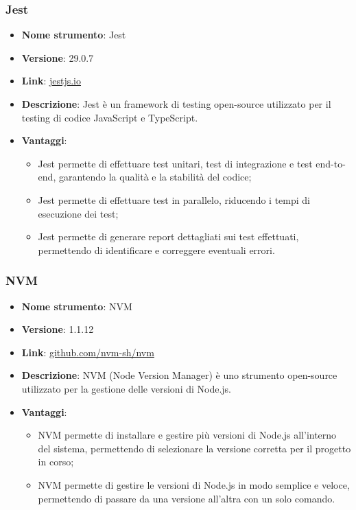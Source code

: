 \subsubsection{Jest}
\begin{itemize}
      \item \textbf{Nome strumento}: Jest
      \item \textbf{Versione}: 29.0.7
      \item \textbf{Link}: \href{https://jestjs.io/}{jestjs.io}
      \item \textbf{Descrizione}: Jest è un framework di testing open-source utilizzato per il testing di codice JavaScript e TypeScript.
      \item \textbf{Vantaggi}:
            \begin{itemize}
                  \item Jest permette di effettuare test unitari, test di integrazione e test end-to-end, garantendo la qualità e la stabilità del codice;
                  \item Jest permette di effettuare test in parallelo, riducendo i tempi di esecuzione dei test;
                  \item Jest permette di generare report dettagliati sui test effettuati, permettendo di identificare e correggere eventuali errori.
            \end{itemize}
\end{itemize}


\subsubsection{NVM}
\begin{itemize}
      \item \textbf{Nome strumento}: NVM
      \item \textbf{Versione}: 1.1.12
      \item \textbf{Link}: \href{https://github.com/nvm-sh/nvm}{github.com/nvm-sh/nvm}
      \item \textbf{Descrizione}: NVM (Node Version Manager) è uno strumento open-source utilizzato per la gestione delle versioni di Node.js.
      \item \textbf{Vantaggi}:
            \begin{itemize}
                  \item NVM permette di installare e gestire più versioni di Node.js all'interno del sistema, permettendo di selezionare la versione corretta
                        per il progetto in corso;
                  \item NVM permette di gestire le versioni di Node.js in modo semplice e veloce, permettendo di passare da una versione all'altra con un solo comando.
            \end{itemize}
\end{itemize}

